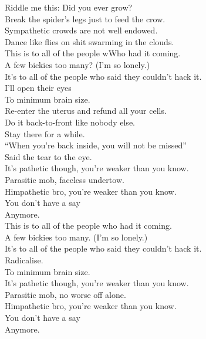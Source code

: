 Riddle me this: Did you ever grow? \\
Break the spider's legs just to feed the crow. \\
Sympathetic crowds are not well endowed. \\
Dance like flies on shit swarming in the clouds. \\

This is to all of the people wWho had it coming. \\
A few bickies too many? (I'm so lonely.) \\
It's to all of the people who said they couldn't hack it. \\
I'll open their eyes \\

To minimum brain size. \\

Re-enter the uterus and refund all your cells. \\
Do it back-to-front like nobody else. \\
Stay there for a while. \\
``When you're back inside, you will not be missed'' \\
Said the tear to the eye. \\

It's pathetic though, you're weaker than you know. \\
Parasitic mob, faceless undertow. \\
Himpathetic bro, you're weaker than you know. \\
You don't have a say \\
Anymore. \\

This is to all of the people who had it coming. \\
A few bickies too many. (I'm so lonely.) \\
It's to all of the people who said they couldn't hack it. \\
Radicalise. \\

To minimum brain size. \\

It's pathetic though, you're weaker than you know. \\
Parasitic mob, no worse off alone. \\
Himpathetic bro, you're weaker than you know. \\
You don't have a say \\
Anymore. \\

